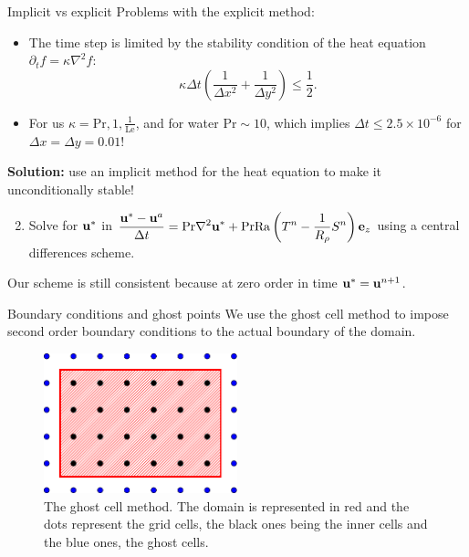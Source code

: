 \documentclass[10pt]{beamer}
\def\Ra{\mathrm{Ra}}
\def\Pr{\mathrm{Pr}}
\def\Le{\mathrm{Le}}
\begin{document}
\begin{frame}{Implicit vs explicit}
  Problems with the explicit method:
  \begin{itemize}
    \item The time step is limited by the stability condition of the heat equation $\partial_t f= \kappa\nabla^2 f$:
          $$
            \kappa\Delta t\left( \frac{1}{\Delta x^2} + \frac{1}{\Delta y^2} \right) \leq \frac{1}{2}.
          $$
    \item For us $\kappa = \Pr,1,\frac{1}{\Le}$, and for water $\Pr\sim 10$, which implies $\Delta t\leq 2.5\times 10^{-6}$ for $\Delta x=\Delta y=0.01$!
  \end{itemize}
  \vspace{0.5cm}
  \textbf{Solution:} use an implicit method for the heat equation to make it unconditionally stable!
  \begin{enumerate}
    \setcounter{enumi}{1}
    \item Solve for $\boldsymbol{\mathrm{u}}^*$ in $\displaystyle  \frac{\vf{u}^* - \vf{u}^a}{\Delta t} = \Pr \nabla^2 \vf{u}^* +\Pr\Ra\left(T^n - \frac{1}{R_{\rho}}S^n\right)\vf{e}_z$ using a central differences scheme.
  \end{enumerate}
  Our scheme is still consistent because at zero order in time $\boldsymbol{\mathrm{u}}^* = \boldsymbol{\mathrm{u}}^{n+1}$.
\end{frame}

\begin{frame}{Boundary conditions and ghost points}
  We use the ghost cell method to impose second order boundary conditions to the actual boundary of the domain.
  \vspace{0.5cm}

  \begin{figure}
    \centering
    \includegraphics[width=0.5\textwidth]{images/grid.pdf}
    \caption{The ghost cell method. The domain is represented in red and the dots represent the grid cells, the black ones being the inner cells and the blue ones, the ghost cells.}
  \end{figure}

\end{frame}
\end{document}
